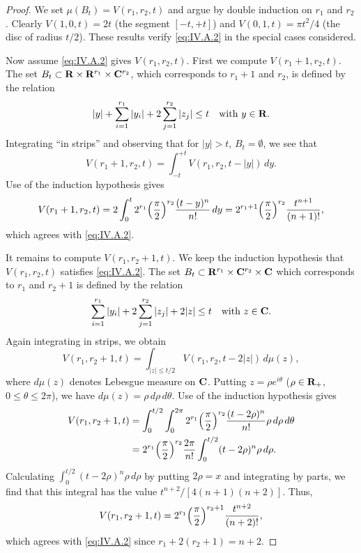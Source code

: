 \begin{proof}
We set $\mu(B_{t})=V(r_{1},r_{2},t)$ and argue by double induction on $r_{1}$
and $r_{2}$. Clearly $V(1,0,t)=2t$ (the segment $[-t,+t]$) and
$V(0,1,t)=\pi t^{2}/4$ (the disc of radius $t/2$). These results verify
\eqref{eq:IV.A.2} in the special cases considered.

Now assume \eqref{eq:IV.A.2} gives $V(r_{1},r_{2},t)$. First we compute
$V(r_{1}+1,r_{2},t)$. The set
$B_{t}\subset\mathbf{R}\times\mathbf{R}^{r_{1}}\times\mathbf{C}^{r_{2}}$, which corresponds to
$r_{1}+1$ and $r_{2}$, is defined by the relation
\[
|y|+\sum_{i=1}^{r_{1}}|y_{i}|+2\sum_{j=1}^{r_{2}}|z_{j}|\leq t
\quad\text{with }y\in\mathbf{R}.
\]
Integrating ``in strips'' and observing that for $|y|>t$,
$B_{t}=\emptyset$, we see that
\[
V(r_{1}+1,r_{2},t)=\int_{-t}^{+t}V(r_{1},r_{2},t-|y|)\,dy.
\]
Use of the induction hypothesis gives
\[
V(r_{1}+1,r_{2},t)=2\int_{0}^{t}2^{r_{1}}
\Bigl(\frac{\pi}{2}\Bigr)^{r_{2}}\frac{(t-y)^{n}}{n!}\,dy
=2^{r_{1}+1}\Bigl(\frac{\pi}{2}\Bigr)^{r_{2}}
\frac{t^{n+1}}{(n+1)!},
\]
which agrees with \eqref{eq:IV.A.2}.

It remains to compute $V(r_{1},r_{2}+1,t)$. We keep the induction hypothesis
that $V(r_{1},r_{2},t)$ satisfies \eqref{eq:IV.A.2}. The set
$B_{t}\subset\mathbf{R}^{r_{1}}\times\mathbf{C}^{r_{2}}\times\mathbf{C}$ which corresponds to
$r_{1}$ and $r_{2}+1$ is defined by the relation
\[
\sum_{i=1}^{r_{1}}|y_{i}|+2\sum_{j=1}^{r_{2}}|z_{j}|+2|z|\leq t
\quad\text{with }z\in\mathbf{C}.
\]
Again integrating in strips, we obtain
\[
V(r_{1},r_{2}+1,t)=\int_{|z|\leq t/2}
V(r_{1},r_{2},t-2|z|)\,d\mu(z),
\]
where $d\mu(z)$ denotes Lebesgue measure on $\mathbf{C}$. Putting
$z=\rho e^{i\theta}$ ($\rho\in\mathbf{R}_{+}$, $0\leq\theta\leq2\pi$), we have
$d\mu(z)=\rho\,d\rho\,d\theta$. Use of the induction hypothesis gives
\[
\begin{aligned}
V(r_{1},r_{2}+1,t)
&=\int_{0}^{t/2}\int_{0}^{2\pi}2^{r_{1}}
\Bigl(\frac{\pi}{2}\Bigr)^{r_{2}}\frac{(t-2\rho)^{n}}{n!}
\rho\,d\rho\,d\theta\\
&=2^{r_{1}}\Bigl(\frac{\pi}{2}\Bigr)^{r_{2}}\frac{2\pi}{n!}
\int_{0}^{t/2}(t-2\rho)^{n}\rho\,d\rho.
\end{aligned}
\]
Calculating $\int_{0}^{t/2}(t-2\rho)^{n}\rho\,d\rho$ by putting $2\rho=x$
and integrating by parts, we find that this integral has the value
$t^{n+2}/[4(n+1)(n+2)]$. Thus,
\[
V(r_{1},r_{2}+1,t)=2^{r_{1}}\Bigl(\frac{\pi}{2}\Bigr)^{r_{2}+1}
\frac{t^{n+2}}{(n+2)!},
\]
which agrees with \eqref{eq:IV.A.2} since $r_{1}+2(r_{2}+1)=n+2$.
\end{proof}
